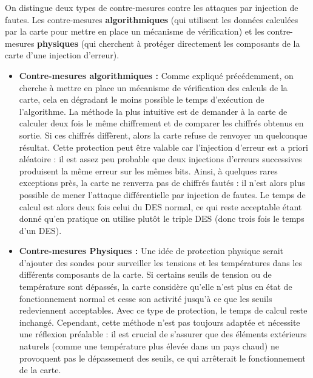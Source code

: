 \documentclass[12pt,a4paper]{report}
\begin{document}
On distingue deux types de contre-mesures contre les attaques par injection de fautes. Les contre-mesures \textbf{algorithmiques} (qui utilisent les données calculées par la carte pour mettre en place un mécanisme de vérification) et les contre-mesures \textbf{physiques} (qui cherchent à protéger directement les composants de la carte d'une injection d'erreur).\newline
\begin{itemize}
	\item \textbf{Contre-mesures algorithmiques : } Comme expliqué précédemment, on cherche à mettre en place un mécanisme de vérification des calculs de la carte, cela en dégradant le moins possible le temps d’exécution de l’algorithme. La méthode la plus intuitive est de demander à la carte de calculer deux fois le même chiffrement et de comparer les chiffrés obtenus en sortie. Si ces chiffrés diffèrent, alors la carte refuse de renvoyer un quelconque résultat. Cette protection peut être valable car l’injection d’erreur est a priori aléatoire : il est assez peu probable que deux injections d’erreurs successives produisent la même erreur sur les mêmes bits. Ainsi, à quelques rares exceptions près, la carte ne renverra pas de chiffrés fautés : il n’est alors plus possible de mener l’attaque différentielle par injection de fautes. Le temps de calcul est alors deux fois celui du DES normal, ce qui reste acceptable étant donné qu’en pratique on utilise plutôt le triple DES (donc trois fois le temps d’un DES). \newline
	
	\item \textbf{Contre-mesures Physiques :} Une idée de protection physique serait d’ajouter des sondes pour surveiller les tensions et les températures dans les différents composants de la carte. Si certains seuils de tension ou de température sont dépassés, la carte considère qu’elle n’est plus en état de fonctionnement normal et cesse son activité jusqu’à ce que les seuils redeviennent acceptables. Avec ce type de protection, le temps de calcul reste inchangé. Cependant, cette méthode n’est pas toujours adaptée et nécessite une réflexion préalable : il est crucial de s'assurer que des éléments extérieurs naturels (comme une température plus élevée dans un pays chaud) ne provoquent pas le dépassement des seuils, ce qui arrêterait le fonctionnement de la carte.
\end{itemize}
\end{document}
